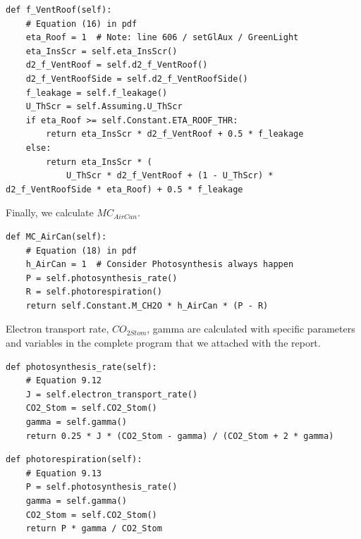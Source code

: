 \documentclass[a4paper]{article}
\begin{document}
\begin{mdframed}[leftline=false,rightline=false,backgroundcolor=magenta!10,nobreak=true]
  \begin{verbatim}
def f_VentRoof(self):
    # Equation (16) in pdf
    eta_Roof = 1  # Note: line 606 / setGlAux / GreenLight
    eta_InsScr = self.eta_InsScr()
    d2_f_VentRoof = self.d2_f_VentRoof()
    d2_f_VentRoofSide = self.d2_f_VentRoofSide()
    f_leakage = self.f_leakage()
    U_ThScr = self.Assuming.U_ThScr
    if eta_Roof >= self.Constant.ETA_ROOF_THR:
        return eta_InsScr * d2_f_VentRoof + 0.5 * f_leakage
    else:
        return eta_InsScr * (
            U_ThScr * d2_f_VentRoof + (1 - U_ThScr) * d2_f_VentRoofSide * eta_Roof) + 0.5 * f_leakage
  \end{verbatim}
\end{mdframed}

Finally, we calculate \(MC_{AirCan}\).
\begin{mdframed}[leftline=false,rightline=false,backgroundcolor=magenta!10,nobreak=true]
  \begin{verbatim}
def MC_AirCan(self):
    # Equation (18) in pdf
    h_AirCan = 1  # Consider Photosynthesis always happen
    P = self.photosynthesis_rate()
    R = self.photorespiration()
    return self.Constant.M_CH2O * h_AirCan * (P - R)
  \end{verbatim}
\end{mdframed}

Electron transport rate, \(CO_{2 Stom}\), gamma are calculated with specific parameters and variables in the complete program that we attached with the report.
\begin{mdframed}[leftline=false,rightline=false,backgroundcolor=magenta!10,nobreak=true]
  \begin{verbatim}
def photosynthesis_rate(self):
    # Equation 9.12
    J = self.electron_transport_rate()
    CO2_Stom = self.CO2_Stom()
    gamma = self.gamma()
    return 0.25 * J * (CO2_Stom - gamma) / (CO2_Stom + 2 * gamma)
  \end{verbatim}
\end{mdframed}

\begin{mdframed}[leftline=false,rightline=false,backgroundcolor=magenta!10,nobreak=true]
  \begin{verbatim}
def photorespiration(self):
    # Equation 9.13
    P = self.photosynthesis_rate()
    gamma = self.gamma()
    CO2_Stom = self.CO2_Stom()
    return P * gamma / CO2_Stom
  \end{verbatim}
\end{mdframed}
\end{document}
